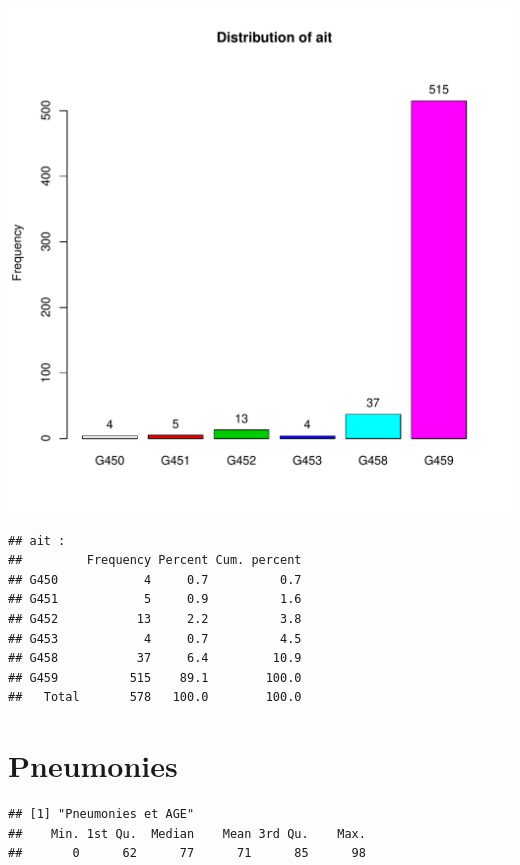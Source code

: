 \documentclass[12pt,english,french,twoside]{report}\usepackage[]{graphicx}\usepackage[]{color}
\makeatletter
\def\maxwidth{ %
  \ifdim\Gin@nat@width>\linewidth
    \linewidth
  \else
    \Gin@nat@width
  \fi
}
\newenvironment{kframe}{%
 \def\at@end@of@kframe{}%
 \ifinner\ifhmode%
  \def\at@end@of@kframe{\end{minipage}}%
  \begin{minipage}{\columnwidth}%
 \fi\fi%
 \def\FrameCommand##1{\hskip\@totalleftmargin \hskip-\fboxsep
 \colorbox{shadecolor}{##1}\hskip-\fboxsep
     \hskip-\linewidth \hskip-\@totalleftmargin \hskip\columnwidth}%
 \MakeFramed {\advance\hsize-\width
   \@totalleftmargin\z@ \linewidth\hsize
   \@setminipage}}%
 {\par\unskip\endMakeFramed%
 \at@end@of@kframe}
\newenvironment{knitrout}{}{} %
\makeatother
\begin{document}
\begin{knitrout}
\color{fgcolor}
\includegraphics[width=\maxwidth]{figure/ait} 
\begin{kframe}\begin{verbatim}
## ait :  
##         Frequency Percent Cum. percent
## G450            4     0.7          0.7
## G451            5     0.9          1.6
## G452           13     2.2          3.8
## G453            4     0.7          4.5
## G458           37     6.4         10.9
## G459          515    89.1        100.0
##   Total       578   100.0        100.0
\end{verbatim}
\end{kframe}
\end{knitrout}


\section{Pneumonies}

\begin{knitrout}
\color{fgcolor}\begin{kframe}
\begin{verbatim}
## [1] "Pneumonies et AGE"
##    Min. 1st Qu.  Median    Mean 3rd Qu.    Max. 
##       0      62      77      71      85      98
\end{verbatim}
\end{kframe}
\end{knitrout}
\end{document}
